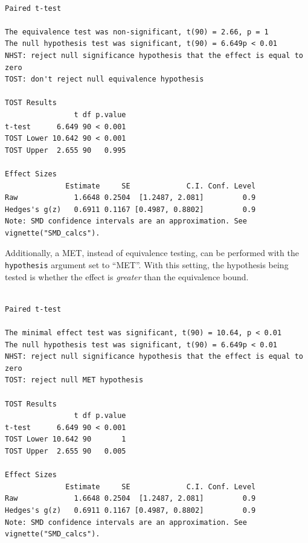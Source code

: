 \documentclass[
]{interact}
\newenvironment{Shaded}{\begin{snugshade}}{\end{snugshade}}
\newcommand{\AttributeTok}[1]{\textcolor[rgb]{0.40,0.45,0.13}{#1}}
\newcommand{\ConstantTok}[1]{\textcolor[rgb]{0.56,0.35,0.01}{#1}}
\newcommand{\DecValTok}[1]{\textcolor[rgb]{0.68,0.00,0.00}{#1}}
\newcommand{\FunctionTok}[1]{\textcolor[rgb]{0.28,0.35,0.67}{#1}}
\newcommand{\NormalTok}[1]{\textcolor[rgb]{0.00,0.23,0.31}{#1}}
\newcommand{\OtherTok}[1]{\textcolor[rgb]{0.00,0.23,0.31}{#1}}
\newcommand{\SpecialCharTok}[1]{\textcolor[rgb]{0.37,0.37,0.37}{#1}}
\newcommand{\StringTok}[1]{\textcolor[rgb]{0.13,0.47,0.30}{#1}}
\begin{document}
\begin{verbatim}

Paired t-test

The equivalence test was non-significant, t(90) = 2.66, p = 1
The null hypothesis test was significant, t(90) = 6.649p < 0.01
NHST: reject null significance hypothesis that the effect is equal to zero 
TOST: don't reject null equivalence hypothesis

TOST Results 
                t df p.value
t-test      6.649 90 < 0.001
TOST Lower 10.642 90 < 0.001
TOST Upper  2.655 90   0.995

Effect Sizes 
              Estimate     SE             C.I. Conf. Level
Raw             1.6648 0.2504  [1.2487, 2.081]         0.9
Hedges's g(z)   0.6911 0.1167 [0.4987, 0.8802]         0.9
Note: SMD confidence intervals are an approximation. See vignette("SMD_calcs").
\end{verbatim}

\newpage

Additionally, a MET, instead of equivalence testing, can be performed
with the \texttt{hypothesis} argument set to ``MET''. With this setting,
the hypothesis being tested is whether the effect is \emph{greater} than
the equivalence bound.

\begin{Shaded}
\end{Shaded}

\begin{verbatim}

Paired t-test

The minimal effect test was significant, t(90) = 10.64, p < 0.01
The null hypothesis test was significant, t(90) = 6.649p < 0.01
NHST: reject null significance hypothesis that the effect is equal to zero 
TOST: reject null MET hypothesis

TOST Results 
                t df p.value
t-test      6.649 90 < 0.001
TOST Lower 10.642 90       1
TOST Upper  2.655 90   0.005

Effect Sizes 
              Estimate     SE             C.I. Conf. Level
Raw             1.6648 0.2504  [1.2487, 2.081]         0.9
Hedges's g(z)   0.6911 0.1167 [0.4987, 0.8802]         0.9
Note: SMD confidence intervals are an approximation. See vignette("SMD_calcs").
\end{verbatim}
\end{document}
